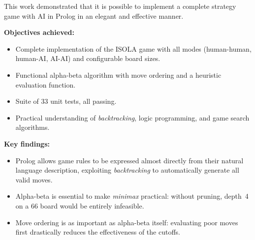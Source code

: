 This work demonstrated that it is possible to implement a complete
strategy game with AI in Prolog in an elegant and effective manner.

\textbf{Objectives achieved:}
\begin{itemize}
  \item Complete implementation of the ISOLA game with all modes
        (human-human, human-AI, AI-AI) and configurable board sizes.
  \item Functional alpha-beta algorithm with move ordering
        and a heuristic evaluation function.
  \item Suite of 33 unit tests, all passing.
  \item Practical understanding of \textit{backtracking}, logic
        programming, and game search algorithms.
\end{itemize}

\textbf{Key findings:}
\begin{itemize}
  \item Prolog allows game rules to be expressed almost
        directly from their natural language description,
        exploiting \textit{backtracking} to automatically generate
        all valid moves.
  \item Alpha-beta is essential to make \textit{minimax}
        practical: without pruning, depth~4 on a 6{\texttimes}6 board
        would be entirely infeasible.
  \item Move ordering is as important as alpha-beta itself:
        evaluating poor moves first drastically reduces
        the effectiveness of the cutoffs.
\end{itemize}
